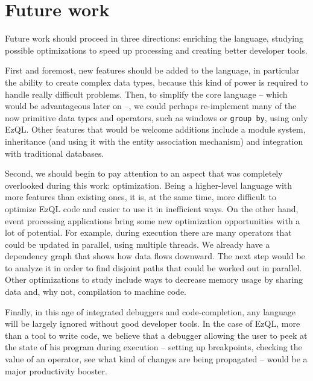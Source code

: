\section{Future work}

Future work should proceed in three directions: enriching the
language, studying possible optimizations to speed up processing and
creating better developer tools.

First and foremost, new features should be added to the language, in
particular the ability to create complex data types, because this kind
of power is required to handle really difficult problems. Then, to
simplify the core language -- which would be advantageous later on --,
we could perhaps re-implement many of the now primitive data types and
operators, such as windows or \verb=group by=, using only EzQL. Other
features that would be welcome additions include a module system,
inheritance (and using it with the entity association mechanism) and
integration with traditional databases.

Second, we should begin to pay attention to an aspect that was
completely overlooked during this work: optimization. Being a
higher-level language with more features than existing ones, it is, at
the same time, more difficult to optimize EzQL code and easier to use
it in inefficient ways. On the other hand, event processing
applications bring some new optimization opportunities with a lot of
potential. For example, during execution there are many operators that
could be updated in parallel, using multiple threads. We already have
a dependency graph that shows how data flows downward. The next step
would be to analyze it in order to find disjoint paths that could be
worked out in parallel. Other optimizations to study include ways to
decrease memory usage by sharing data and, why not, compilation to
machine code.

Finally, in this age of integrated debuggers and code-completion, any
language will be largely ignored without good developer tools. In the
case of EzQL, more than a tool to write code, we believe that a
debugger allowing the user to peek at the state of his program during
execution -- setting up breakpoints, checking the value of an operator,
see what kind of changes are being propagated -- would be a major
productivity booster.
